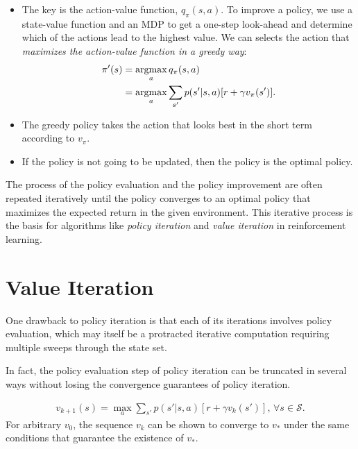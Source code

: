 \begin{itemize}
	\item The key is the action-value function, $q_\pi(s,a)$. To improve a policy, we use a state-value function and an MDP to get a one-step look-ahead and determine which of the actions lead to the highest value. We can selects the action that \textit{maximizes the action-value function in a greedy way}: 
		\begin{align*}
			\pi'(s) &= \operatorname*{\operatorname{argmax}}_a q_\pi(s,a)\\
			&= \operatorname*{\operatorname{argmax}}_a \sum_{s'}p(s'|s,a)[r + \gamma v_\pi(s')].
		\end{align*}
	\item The greedy policy takes the action that looks best in the short term according to $v_\pi$.
	\item If the policy is not going to be updated, then the policy is the optimal policy.
\end{itemize}

The process of the policy evaluation and the policy improvement are often repeated iteratively until the policy converges to an optimal policy that maximizes the expected return in the given environment. This iterative process is the basis for algorithms like \textit{policy iteration} and \textit{value iteration} in reinforcement learning.

\section{Value Iteration}
One drawback to policy iteration is that each of its iterations involves policy evaluation, which may itself be a protracted iterative computation requiring multiple sweeps through the state set.

In fact, the policy evaluation step of policy iteration can be truncated in several ways without losing the convergence guarantees of policy iteration.

\begin{align}
	v_{k+1}(s)=\max_a \sum_{s'}p(s'|s,a)[r + \gamma v_k(s')], \, \forall s\in \mathcal{S}.
	\label{eq:value_iteration}
\end{align}
For arbitrary $v_0$, the sequence $v_k$ can be shown to converge to $v_*$ under the same conditions that guarantee the existence of $v_*$.

